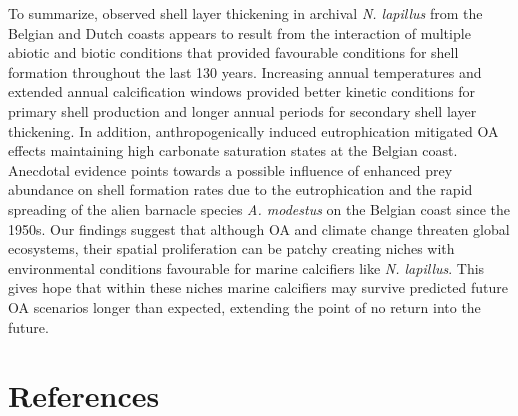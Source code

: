 \documentclass[smallextended]{svjour3}       %
\begin{document}
To summarize, observed shell layer thickening in archival \emph{N.
lapillus} from the Belgian and Dutch coasts appears to result from the
interaction of multiple abiotic and biotic conditions that provided
favourable conditions for shell formation throughout the last 130 years.
Increasing annual temperatures and extended annual calcification windows
provided better kinetic conditions for primary shell production and
longer annual periods for secondary shell layer thickening. In addition,
anthropogenically induced eutrophication mitigated OA effects
maintaining high carbonate saturation states at the Belgian coast.
Anecdotal evidence points towards a possible influence of enhanced prey
abundance on shell formation rates due to the eutrophication and the
rapid spreading of the alien barnacle species \emph{A. modestus} on the
Belgian coast since the 1950s. Our findings suggest that although OA and
climate change threaten global ecosystems, their spatial proliferation
can be patchy creating niches with environmental conditions favourable
for marine calcifiers like \emph{N. lapillus}. This gives hope that
within these niches marine calcifiers may survive predicted future OA
scenarios longer than expected, extending the point of no return into
the future.

\hypertarget{references}{%
\section*{References}\label{references}}
\end{document}

